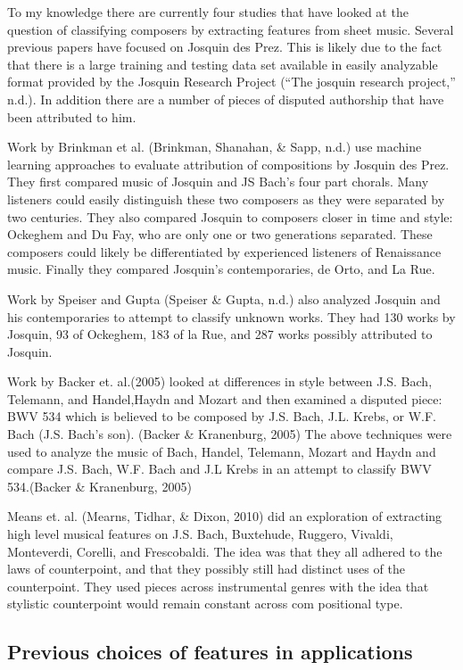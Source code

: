 \documentclass[12pt,twoside]{reedthesis}
\theoremstyle{definition}
\theoremstyle{definition}
\theoremstyle{definition}
\theoremstyle{remark}
\begin{document}
To my knowledge there are currently four studies that have looked at the
question of classifying composers by extracting features from sheet
music. Several previous papers have focused on Josquin des Prez. This is
likely due to the fact that there is a large training and testing data
set available in easily analyzable format provided by the Josquin
Research Project (``The josquin research project,'' n.d.). In addition
there are a number of pieces of disputed authorship that have been
attributed to him.

Work by Brinkman et al. (Brinkman, Shanahan, \& Sapp, n.d.) use machine
learning approaches to evaluate attribution of compositions by Josquin
des Prez. They first compared music of Josquin and JS Bach's four part
chorals. Many listeners could easily distinguish these two composers as
they were separated by two centuries. They also compared Josquin to
composers closer in time and style: Ockeghem and Du Fay, who are only
one or two generations separated. These composers could likely be
differentiated by experienced listeners of Renaissance music. Finally
they compared Josquin's contemporaries, de Orto, and La Rue.

Work by Speiser and Gupta (Speiser \& Gupta, n.d.) also analyzed Josquin
and his contemporaries to attempt to classify unknown works. They had
130 works by Josquin, 93 of Ockeghem, 183 of la Rue, and 287 works
possibly attributed to Josquin.

Work by Backer et. al.(2005) looked at differences in style between J.S.
Bach, Telemann, and Handel,Haydn and Mozart and then examined a disputed
piece: BWV 534 which is believed to be composed by J.S. Bach, J.L.
Krebs, or W.F. Bach (J.S. Bach's son). (Backer \& Kranenburg, 2005) The
above techniques were used to analyze the music of Bach, Handel,
Telemann, Mozart and Haydn and compare J.S. Bach, W.F. Bach and J.L
Krebs in an attempt to classify BWV 534.(Backer \& Kranenburg, 2005)

Means et. al. (Mearns, Tidhar, \& Dixon, 2010) did an exploration of
extracting high level musical features on J.S. Bach, Buxtehude, Ruggero,
Vivaldi, Monteverdi, Corelli, and Frescobaldi. The idea was that they
all adhered to the laws of counterpoint, and that they possibly still
had distinct uses of the counterpoint. They used pieces across
instrumental genres with the idea that stylistic counterpoint would
remain constant across com positional type.

\subsection{Previous choices of features in
applications}\label{previous-choices-of-features-in-applications}
\end{document}
